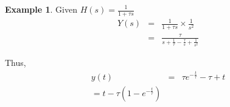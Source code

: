 \documentclass[11pt]{article} %
\theoremstyle{definition}
\newtheorem{example}{Example}
\begin{document}
\begin{example}

Given $H(s) = \frac{1}{1+\tau s}$
\begin{eqnarray}
Y(s) &=& \frac{1}{1+\tau s} \times \frac{1}{s^2} \\
&=& \frac{\tau}{s+\frac{1}{\tau} - \frac{\tau}{s} + \frac{1}{s^2}}
\end{eqnarray}

Thus,
\begin{eqnarray}
y(t) &=& \tau e^{-\frac{t}{\tau}} - \tau + t \\
= t-\tau\left(1-e^{-\frac{t}{\tau}}\right)
\end{eqnarray}
\end{example}
\end{document}
